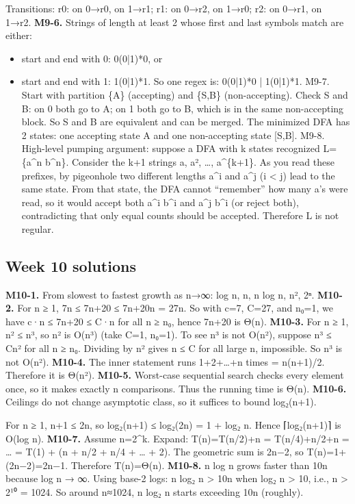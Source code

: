 \documentclass[11pt]{article}
\begin{document}
Transitions:
r0: on 0→r0, on 1→r1;
r1: on 0→r2, on 1→r0;
r2: on 0→r1, on 1→r2.
\textbf{M9-6.} Strings of length at least 2 whose first and last symbols match are either:
\begin{itemize}[leftmargin=*,itemsep=0.25em]
\item start and end with 0: 0(0|1)*0, or
\item start and end with 1: 1(0|1)*1. So one regex is: 0(0|1)*0 | 1(0|1)*1. M9-7. Start with partition \{A\} (accepting) and \{S,B\} (non-accepting). Check S and B: on 0 both go to A; on 1 both go to B, which is in the same non-accepting block. So S and B are equivalent and can be merged. The minimized DFA has 2 states: one accepting state A and one non-accepting state [S,B]. M9-8. High-level pumping argument: suppose a DFA with k states recognized L=\{a\textasciicircum{}n b\textasciicircum{}n\}. Consider the k+1 strings a, a², …, a\textasciicircum{}\{k+1\}. As you read these prefixes, by pigeonhole two different lengths a\textasciicircum{}i and a\textasciicircum{}j (i < j) lead to the same state. From that state, the DFA cannot “remember” how many a’s were read, so it would accept both a\textasciicircum{}i b\textasciicircum{}i and a\textasciicircum{}j b\textasciicircum{}i (or reject both), contradicting that only equal counts should be accepted. Therefore L is not regular.
\end{itemize}
\subsection{Week 10 solutions}
\textbf{M10-1.} From slowest to fastest growth as n→∞: log n, n, n log n, n², 2ⁿ.
\textbf{M10-2.} For n ≥ 1, 7n ≤ 7n+20 ≤ 7n+20n = 27n.
So with c=7, C=27, and n₀=1, we have c·n ≤ 7n+20 ≤ C·n for all n ≥ n₀, hence 7n+20 is
Θ(n).
\textbf{M10-3.} For n ≥ 1, n² ≤ n³, so n² is O(n³) (take C=1, n₀=1).
To see n³ is not O(n²), suppose n³ ≤ Cn² for all n ≥ n₀. Dividing by n² gives n ≤ C for all
large n, impossible. So n³ is not O(n²).
\textbf{M10-4.} The inner statement runs 1+2+…+n times = n(n+1)/2. Therefore it is Θ(n²).
\textbf{M10-5.} Worst-case sequential search checks every element once, so it makes exactly n
comparisons.
Thus the running time is Θ(n).
\textbf{M10-6.} Ceilings do not change asymptotic class, so it suffices to bound log₂(n+1).

For n ≥ 1, n+1 ≤ 2n, so log₂(n+1) ≤ log₂(2n) = 1 + log₂ n.
Hence ⌈log₂(n+1)⌉ is O(log n).
\textbf{M10-7.} Assume n=2\textasciicircum{}k. Expand:
T(n)=T(n/2)+n = T(n/4)+n/2+n = … = T(1) + (n + n/2 + n/4 + … + 2).
The geometric sum is 2n−2, so T(n)=1+(2n−2)=2n−1. Therefore T(n)=Θ(n).
\textbf{M10-8.} n log n grows faster than 10n because log n → ∞.
Using base-2 logs: n log₂ n > 10n when log₂ n > 10, i.e., n > 2¹⁰ = 1024.
So around n≈1024, n log₂ n starts exceeding 10n (roughly).
\end{document}
